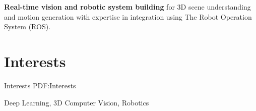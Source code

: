 \documentclass[letterpaper,MMMyyyy,nonstop]{simpleresumecv}
\newcommand{\CVNote}{CV compiled on {\today}}
\begin{document}
\begin{body}
\BulletItem
\textbf{Real-time vision and robotic system building} for 3D scene understanding and motion generation with expertise in integration using The Robot Operation System (ROS).

%
%

\BigGapNoBreak

\section
{Interests}
{Interests}
{PDF:Interests}

Deep Learning,
3D Computer Vision,
Robotics

\end{body}


\end{document}
